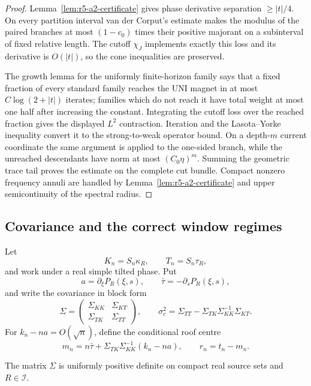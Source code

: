 \begin{proof}
Lemma~\ref{lem:r5-a2-certificate} gives phase derivative separation
\(\ge |t|/4\).  On every partition interval van der Corput's estimate makes
the modulus of the paired branches at most
\((1-c_0)\) times their positive majorant on a subinterval of fixed relative
length.  The cutoff \(\chi_J\) implements exactly this loss and its derivative
is \(O(|t|)\), so the cone inequalities are preserved.

The growth lemma for the uniformly finite-horizon family says that a fixed
fraction of every standard family reaches the UNI magnet in at most
\(C\log(2+|t|)\) iterates; families which do not reach it have total weight
at most one half after increasing the constant.  Integrating the cutoff loss
over the reached fraction gives the displayed \(L^2\) contraction.  Iteration
and the Lasota--Yorke inequality convert it to the strong-to-weak operator
bound.  On a depth-\(m\) current coordinate the same argument is applied to
the one-sided branch, while the unreached descendants have norm at most
\((C_0\eta)^m\).  Summing the geometric trace tail proves the estimate on the
complete cut bundle.  Compact nonzero frequency annuli are handled by
Lemma~\ref{lem:r5-a2-certificate} and upper semicontinuity of the spectral
radius.
\end{proof}

\subsection{Covariance and the correct window regimes}

Let
\[
 K_n=S_n\kappa_R,\qquad T_n=S_n\tau_R,
\]
and work under a real simple tilted phase.  Put
\[
 a=\partial_\xi P_R(\xi,s),\qquad
 \bar\tau=-\partial_sP_R(\xi,s),
\]
and write the covariance in block form
\[
 \Sigma=
 \begin{pmatrix}
  \Sigma_{KK}&\Sigma_{KT}\\
  \Sigma_{TK}&\Sigma_{TT}
 \end{pmatrix},
 \qquad
 \sigma_c^2=\Sigma_{TT}-
 \Sigma_{TK}\Sigma_{KK}^{-1}\Sigma_{KT}.
\]
For \(k_n-na=O(\sqrt n)\), define the conditional roof centre
\[
 m_n=n\bar\tau+
 \Sigma_{TK}\Sigma_{KK}^{-1}(k_n-na),
 \qquad r_n=t_n-m_n.
\]

\begin{lemma}
\label{lem:r5-a2-covariance}
The matrix \(\Sigma\) is uniformly positive definite on compact real source
sets and \(R\in\mathcal I\).
\end{lemma}

